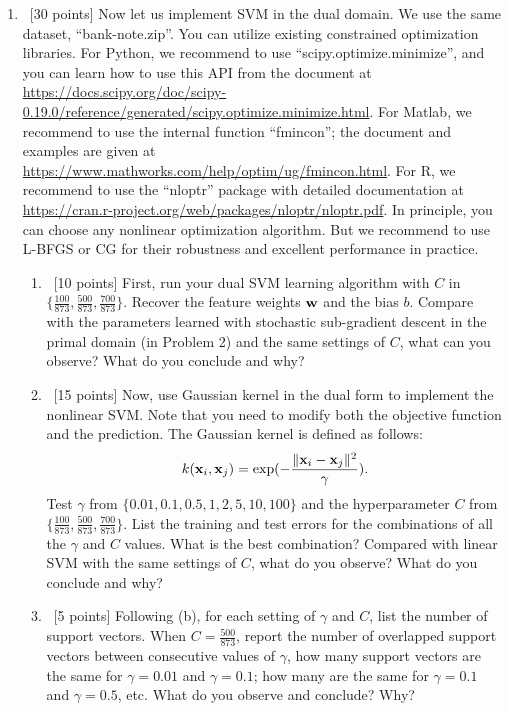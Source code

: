 \documentclass[12pt, fullpage,letterpaper]{article}
\begin{document}
\begin{enumerate}
\begin{enumerate}
	
	
	\end{enumerate}


\item~[30 points] Now let us implement SVM in the dual domain. We use the same dataset, ``bank-note.zip''. You can utilize existing constrained optimization libraries. For Python, we recommend to use ``scipy.optimize.minimize'', and you can learn how to use this API from the document at \url{https://docs.scipy.org/doc/scipy-0.19.0/reference/generated/scipy.optimize.minimize.html}.
For Matlab, we recommend to use the internal function ``fmincon''; the document and examples are given at \url{https://www.mathworks.com/help/optim/ug/fmincon.html}. For R, we recommend to use the ``nloptr'' package with detailed documentation at \url{https://cran.r-project.org/web/packages/nloptr/nloptr.pdf}. In principle, you can choose any nonlinear optimization algorithm. But we recommend to use L-BFGS or CG for their robustness and excellent performance in practice. 

\begin{enumerate}
	\item ~[10 points] First, run your dual SVM learning algorithm with   $C$ in $\{\frac{100}{873}, \frac{500}{873}, \frac{700}{873}\}$. Recover the feature weights ${\bf w}$ and the bias $b$. Compare with the parameters learned with stochastic sub-gradient descent in the primal domain (in Problem 2) and the same settings of $C$, what can you observe? What do you conclude and why?
	
	\item~[15 points] Now, use Gaussian kernel in the dual form to implement the nonlinear SVM. Note that you need to modify both the objective function and the prediction. The Gaussian kernel is defined as follows:
	\[
	k({\bf x}_i, {\bf x}_j) = \exp(-\frac{\|{\bf x}_i - {\bf x}_j\|^2}{\gamma}).
	\]
	Test $\gamma$ from $\{0.01, 0.1, 0.5, 1, 2, 5, 10, 100\}$ and the hyperparameter $C$ from $\{ \frac{100}{873}, \frac{500}{873},  \frac{700}{873}\}$. List the training and test errors for the combinations of all the $\gamma$ and $C$ values. What is the best combination? Compared with linear SVM with the same settings of $C$, what do you observe? What do you conclude and why?  
	
	\item~[5 points] Following (b), for each setting of $\gamma$ and $C$, list the number of support vectors. When $C = \frac{500}{873}$, report the number of overlapped support vectors between consecutive values of $\gamma$, \ie how many support vectors are the same for $\gamma= 0.01$ and $\gamma = 0.1$; how many are the same for  $\gamma = 0.1$ and $\gamma = 0.5$, etc. What do you observe and conclude? Why?
	

\end{enumerate}
\end{enumerate}
\end{document}
